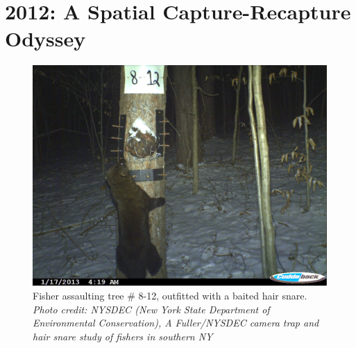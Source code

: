 \chapter{
2012: A Spatial Capture-Recapture Odyssey
}

\label{chapt.final}

\vspace{0.3cm}






\begin{figure}[h!]
\centering
\includegraphics[width=\textwidth]{Ch20-Last/fisher.jpg}
\caption{
Fisher assaulting tree \# 8-12, outfitted with a baited hair snare.
{\it Photo credit: NYSDEC (New York State Department of Environmental Conservation),
A Fuller/NYSDEC camera trap and hair snare study of fishers in
southern NY}
}
\label{last.fig.fisher}
\end{figure}

